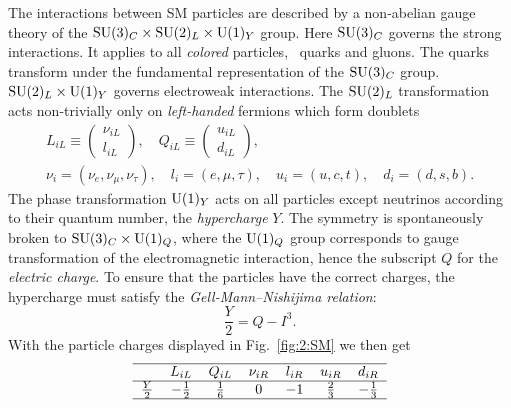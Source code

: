 The interactions between \acs{SM} particles are described by a non-abelian gauge theory of the $\mathrm{SU}(3)_C \times \mathrm{SU}(2)_L \times \mathrm{U}(1)_Y$ group. Here $\mathrm{SU}(3)_C$ governs the strong interactions. It applies to all \textit{colored} particles, \ie~quarks and gluons. The quarks transform under the fundamental representation of the $\mathrm{SU}(3)_C$ group. $\mathrm{SU}(2)_L \times \mathrm{U}(1)_Y$ governs electroweak interactions. The $\mathrm{SU}(2)_L$ transformation acts non-trivially only on \textit{left-handed} fermions which form doublets
\begin{equation}
\begin{gathered}
L_{iL} \equiv \begin{pmatrix}
\nu_{iL} \\
l_{iL}
\end{pmatrix}, \quad Q_{iL} \equiv \begin{pmatrix}
u_{iL} \\
d_{iL}
\end{pmatrix}, \\
\nu_i = \left( \nu_e, \nu_\mu, \nu_\tau \right),\quad  l_i = \left( e, \mu, \tau \right),\quad u_i = \left(u, c, t \right),\quad d_i = \left(d, s, b \right).
\end{gathered}
\end{equation}
The phase transformation $\mathrm{U}(1)_Y$ acts on all particles except neutrinos according to their quantum number, the \textit{hypercharge} $Y$. The symmetry is spontaneously broken to $\mathrm{SU}(3)_C \times \mathrm{U}(1)_Q$, where the $\mathrm{U}(1)_Q$ group corresponds to gauge transformation of the electromagnetic interaction, hence the subscript $Q$ for the \textit{electric charge}. To ensure that the particles have the correct charges, the hypercharge must satisfy the \textit{Gell-Mann--Nishijima relation}:
\begin{equation}
\frac{Y}{2} = Q - I^3.
\end{equation}
With the particle charges displayed in Fig.~\ref{fig:2:SM} we then get
\begin{equation*}
\begin{tabular}{ccccccc}
  \hline
                & $L_{iL}$ & $Q_{iL}$ & $\nu_{iR}$ & $l_{iR}$ & $u_{iR}$ & $d_{iR}$ \\ \hline
  $\frac{Y}{2}$ & $-\frac{1}{2}$ & $\frac{1}{6}$ & $0$ & $-1$ & $\frac{2}{3}$ & $-\frac{1}{3}$ \\ \hline
\end{tabular}
\end{equation*}

